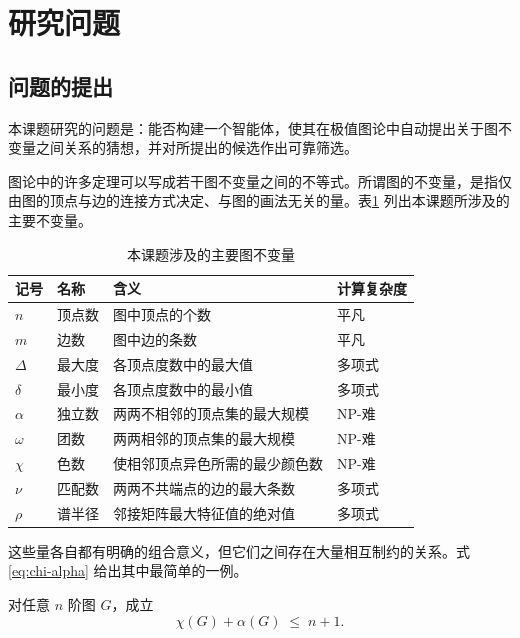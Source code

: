 
\section{研究问题}

\subsection{问题的提出}

本课题研究的问题是：能否构建一个智能体，使其在极值图论中自动提出关于图不变量之间关系的猜想，并对所提出的候选作出可靠筛选。

图论中的许多定理可以写成若干图不变量之间的不等式。所谓图的不变量，是指仅由图的顶点与边的连接方式决定、与图的画法无关的量。表\ref{tab:invariants} 列出本课题所涉及的主要不变量。

\begin{table}[H]
\centering
\small
\caption{本课题涉及的主要图不变量}
\label{tab:invariants}
\begin{tabularx}{\linewidth}{@{}l l X l@{}}
\toprule
记号 & 名称 & 含义 & 计算复杂度 \\
\midrule
$n$ & 顶点数 & 图中顶点的个数 & 平凡 \\
$m$ & 边数 & 图中边的条数 & 平凡 \\
$\Delta$ & 最大度 & 各顶点度数中的最大值 & 多项式 \\
$\delta$ & 最小度 & 各顶点度数中的最小值 & 多项式 \\
$\alpha$ & 独立数 & 两两不相邻的顶点集的最大规模 & NP-难 \\
$\omega$ & 团数 & 两两相邻的顶点集的最大规模 & NP-难 \\
$\chi$ & 色数 & 使相邻顶点异色所需的最少颜色数 & NP-难 \\
$\nu$ & 匹配数 & 两两不共端点的边的最大条数 & 多项式 \\
$\rho$ & 谱半径 & 邻接矩阵最大特征值的绝对值 & 多项式 \\
\bottomrule
\end{tabularx}
\end{table}

这些量各自都有明确的组合意义，但它们之间存在大量相互制约的关系。式 \eqref{eq:chi-alpha} 给出其中最简单的一例。

\begin{proposition}
\label{prop:chi-alpha}
对任意 $n$ 阶图 $G$，成立
\begin{equation}
  \chi(G) + \alpha(G) \;\le\; n + 1 .
  \label{eq:chi-alpha}
\end{equation}
\end{proposition}

